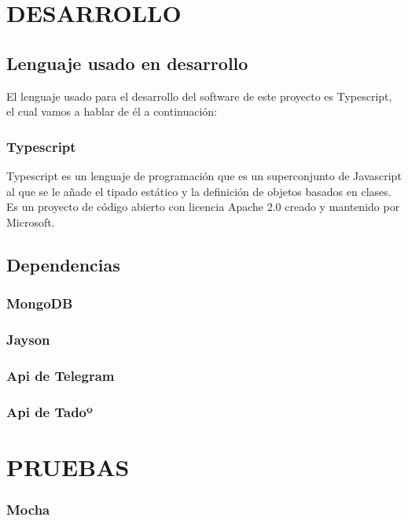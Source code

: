 \documentclass[spanish,12pt, a4paper, twoside]{paper}
\let\oldsection\section
\def\section{\cleardoublepage\oldsection}
\begin{document}
\section{DESARROLLO}

\subsection{Lenguaje usado en desarrollo}

El lenguaje usado para el desarrollo del software de este proyecto es Typescript, el cual vamos a hablar de él a continuación:

\subsubsection{Typescript}

Typescript es un lenguaje de programación que es un superconjunto de Javascript al que se le añade el tipado estático y la definición de objetos basados en clases. Es un proyecto de código abierto con licencia Apache 2.0 creado y mantenido por Microsoft.

\subsection{Dependencias}

\subsubsection{MongoDB}

\subsubsection{Jayson}

\subsubsection{Api de Telegram}

\subsubsection{Api de Tadoº}

\section{PRUEBAS}

\subsubsection{Mocha}
\end{document}
